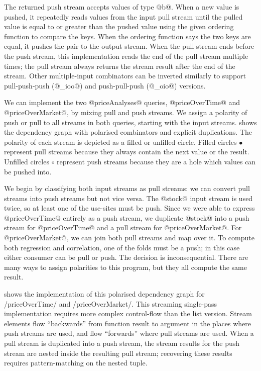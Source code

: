 The returned push stream accepts values of type @b@.
When a new value is pushed, it repeatedly reads values from the input pull stream until the pulled value is equal to or greater than the pushed value using the given ordering function to compare the keys.
When the ordering function says the two keys are equal, it pushes the pair to the output stream.
When the pull stream ends before the push stream, this implementation reads the end of the pull stream multiple times; the pull stream always returns the stream result after the end of the stream.
Other multiple-input combinators can be inverted similarly to support pull-push-push (@_ioo@) and push-pull-push (@_oio@) versions.

We can implement the two @priceAnalyses@ queries, @priceOverTime@ and @priceOverMarket@, by mixing pull and push streams.
We assign a polarity of push or pull to all streams in both queries, starting with the input streams.
 shows the dependency graph with polarised combinators and explicit duplications.
The polarity of each stream is depicted as a filled or unfilled circle.
Filled circles $\bullet$ represent pull streams because they always contain the next value or the result.
Unfilled circles $\circ$ represent push streams because they are a hole which values can be pushed into.



We begin by classifying both input streams as pull streams: we can convert pull streams into push streams but not vice versa.
The @stock@ input stream is used twice, so at least one of the use-sites must be push.
Since we were able to express @priceOverTime@ entirely as a push stream, we duplicate @stock@ into a push stream for @priceOverTime@ and a pull stream for @priceOverMarket@.
For @priceOverMarket@, we can join both pull streams and map over it.
To compute both regression and correlation, one of the folds must be a push; in this case either consumer can be pull or push.
The decision is inconsequential.
There are many ways to assign polarities to this program, but they all compute the same result.

 shows the implementation of this polarised dependency graph for \Hs/priceOverTime/ and \Hs/priceOverMarket/.
This streaming single-pass implementation requires more complex control-flow than the list version.
Stream elements flow ``backwards'' from function result to argument in the places where push streams are used, and flow ``forwards'' where pull streams are used.
When a pull stream is duplicated into a push stream, the stream results for the push stream are nested inside the resulting pull stream; recovering these results requires pattern-matching on the nested tuple.

